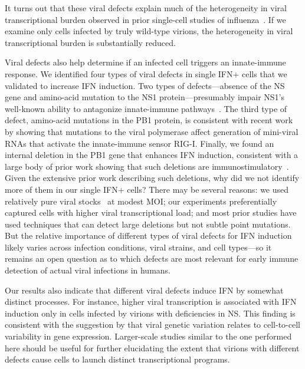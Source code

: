 \documentclass[9pt,lineno]{elife}
\begin{document}
It turns out that these viral defects explain much of the heterogeneity in viral transcriptional burden observed in prior single-cell studies of influenza~\citep{russell2018extreme, steuerman2018dissection, heldt2015single, sjaastad2018distinct}.
If we examine only cells infected by truly wild-type virions, the heterogeneity in viral transcriptional burden is substantially reduced.

Viral defects also help determine if an infected cell triggers an innate-immune response.
We identified four types of viral defects in single IFN+ cells that we validated to increase IFN induction. 
Two types of defects---absence of the NS gene and amino-acid mutation to the NS1 protein---presumably impair NS1's well-known ability to antagonize innate-immune pathways~\citep{garcia1998influenza, hale2008multifunctional}.
The third type of defect, amino-acid mutations in the PB1 protein, is consistent with recent work by \citet{velthuis2018mini} showing that mutations to the viral polymerase affect generation of mini-viral RNAs that activate the innate-immune sensor RIG-I.
Finally, we found an internal deletion in the PB1 gene that enhances IFN induction, consistent with a large body of prior work showing that such deletions are immunostimulatory~\citep{baum2010preference, tapia2013defective, boergeling2015evidence, dimmock2015cloned}.
Given the extensive prior work describing such deletions, why did we not identify more of them in our single IFN+ cells?
There may be several reasons: we used relatively pure viral stocks~\citep{xue2016propagation} at modest MOI; our experiments preferentially captured cells with higher viral transcriptional load; and most prior studies have used techniques that can detect large deletions but not subtle point mutations.
But the relative importance of different types of viral defects for IFN induction likely varies across infection conditions, viral strains, and cell types---so it remains an open question as to which defects are most relevant for early immune detection of actual viral infections in humans.

Our results also indicate that different viral defects induce IFN by somewhat distinct processes.
For instance, higher viral transcription is associated with IFN induction only in cells infected by virions with deficiencies in NS.
This finding is consistent with the suggestion by \citet{sjaastad2018distinct} that viral genetic variation relates to cell-to-cell variability in gene expression.
Larger-scale studies similar to the one performed here should be useful for further elucidating the extent that virions with different defects cause cells to launch distinct transcriptional programs.
\end{document}
